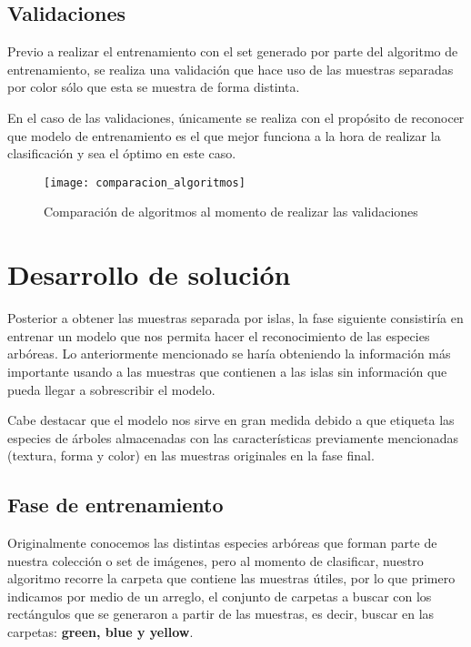 \break

\section{Validaciones}

Previo a realizar el entrenamiento con el set generado por parte del algoritmo de entrenamiento, se realiza una validación que hace uso de las muestras separadas por color sólo que esta se muestra de forma distinta.

En el caso de las validaciones, únicamente se realiza con el propósito de reconocer que modelo de entrenamiento es el que mejor funciona a la hora de realizar la clasificación y sea el óptimo en este caso. \\


\begin{figure}[h]
 \centering
\texttt{[image: comparacion\_algoritmos]}
\caption[Comparación de algoritmos]{Comparación de algoritmos al momento de realizar las validaciones}
\end{figure}

\break

\chapter{Desarrollo de solución}

Posterior a obtener las muestras separada por islas, la fase siguiente consistiría en entrenar un modelo que nos permita hacer el reconocimiento de las especies arbóreas. Lo anteriormente mencionado se haría obteniendo la información más importante usando a las muestras que contienen a las islas sin información que pueda llegar a sobrescribir el modelo.

Cabe destacar que el modelo nos sirve en gran medida debido a que etiqueta las especies de árboles almacenadas con las características previamente mencionadas (textura, forma y color) en las muestras originales en la fase final.

\section{Fase de entrenamiento}
Originalmente conocemos las distintas especies arbóreas que forman parte de nuestra colección o set de imágenes, pero al momento de clasificar, nuestro algoritmo recorre la carpeta que contiene las muestras útiles, por lo que primero indicamos por medio de un arreglo, el conjunto de carpetas a buscar con los rectángulos que se generaron a partir de las muestras, es decir, buscar en las carpetas: \textbf{green, blue y yellow}. \\

